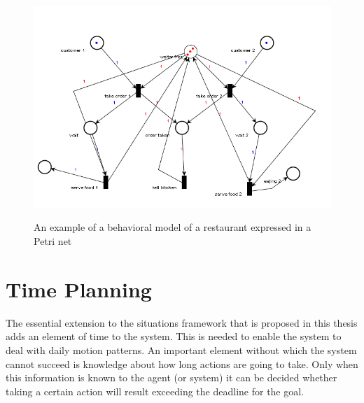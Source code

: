 \documentclass[11pt]{book}
\begin{document}
\begin{figure}
\begin{center}
\includegraphics[width=450pt]{restaurant.png}
\label{restaurantnet}
\end{center}
\caption{An example of a behavioral model of a restaurant expressed in a Petri net}

\end{figure}

\section{Time Planning}
The essential extension to the situations framework that is proposed in this thesis adds an element of time to the system. This is needed to enable the system to deal with daily motion patterns. An important element without which the system cannot succeed is knowledge about how long actions are going to take. Only when this information is known to the agent (or system) it can be decided whether taking a certain action will result exceeding the deadline for the goal.
\end{document}
